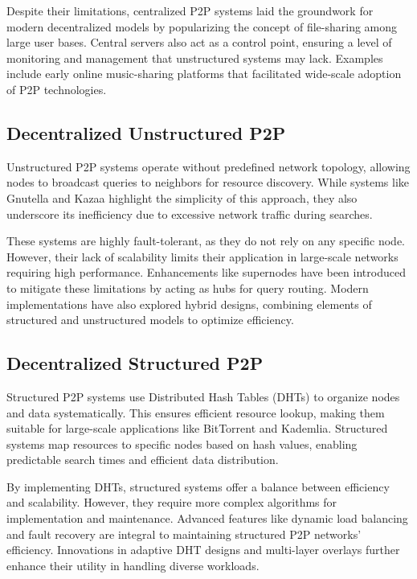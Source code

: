 \documentclass[12pt]{article}
\begin{document}
Despite their limitations, centralized P2P systems laid the groundwork for modern decentralized models by popularizing the concept of file-sharing among large user bases. Central servers also act as a control point, ensuring a level of monitoring and management that unstructured systems may lack. Examples include early online music-sharing platforms that facilitated wide-scale adoption of P2P technologies.

\subsection{Decentralized Unstructured P2P}
Unstructured P2P systems operate without predefined network topology, allowing nodes to broadcast queries to neighbors for resource discovery. While systems like Gnutella and Kazaa highlight the simplicity of this approach, they also underscore its inefficiency due to excessive network traffic during searches.

These systems are highly fault-tolerant, as they do not rely on any specific node. However, their lack of scalability limits their application in large-scale networks requiring high performance. Enhancements like supernodes have been introduced to mitigate these limitations by acting as hubs for query routing. Modern implementations have also explored hybrid designs, combining elements of structured and unstructured models to optimize efficiency.

\subsection{Decentralized Structured P2P}
Structured P2P systems use Distributed Hash Tables (DHTs) to organize nodes and data systematically. This ensures efficient resource lookup, making them suitable for large-scale applications like BitTorrent and Kademlia. Structured systems map resources to specific nodes based on hash values, enabling predictable search times and efficient data distribution.

By implementing DHTs, structured systems offer a balance between efficiency and scalability. However, they require more complex algorithms for implementation and maintenance. Advanced features like dynamic load balancing and fault recovery are integral to maintaining structured P2P networks' efficiency. Innovations in adaptive DHT designs and multi-layer overlays further enhance their utility in handling diverse workloads.
\end{document}
